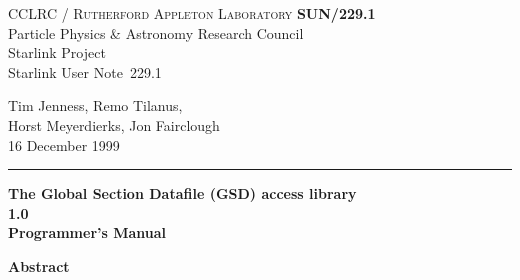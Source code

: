 \documentclass[twoside,11pt]{article}
\newcommand{\stardoccategory}  {Starlink User Note}
\newcommand{\stardocinitials}  {SUN}
\newcommand{\stardocnumber}    {229.1}
\newcommand{\stardocauthors}   {Tim Jenness, Remo Tilanus, \\
Horst Meyerdierks, Jon Fairclough}
\newcommand{\stardocdate}      {16 December 1999}
\newcommand{\stardoctitle}     {The Global Section Datafile (GSD) access
library}
\newcommand{\stardocversion}   {1.0}
\newcommand{\stardocmanual}    {Programmer's Manual}
\newcommand{\stardocname}{\stardocinitials /\stardocnumber}
\newenvironment{latexonly}{}{}
\renewcommand{\_}{\texttt{\symbol{95}}}
\begin{document}
\thispagestyle{empty}

\begin{latexonly}
   CCLRC / \textsc{Rutherford Appleton Laboratory} \hfill \textbf{\stardocname}\\
   {\large Particle Physics \& Astronomy Research Council}\\
   {\large Starlink Project\\}
   {\large \stardoccategory\ \stardocnumber}
   \begin{flushright}
   \stardocauthors\\
   \stardocdate
   \end{flushright}
   \vspace{-4mm}
   \rule{\textwidth}{0.5mm}
   \vspace{5mm}
   \begin{center}
   {\Huge\textbf{\stardoctitle \\ [2.5ex]}}
   {\LARGE\textbf{\stardocversion \\ [4ex]}}
   {\Huge\textbf{\stardocmanual}}
   \end{center}
   \vspace{5mm}


   \vspace{10mm}
   \begin{center}
      {\Large\textbf{Abstract}}
   \end{center}
\end{latexonly}
\end{document}
